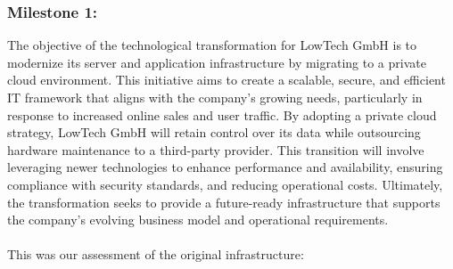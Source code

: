 \documentclass{llncs}
\begin{document}
\subsubsection{Milestone 1:}

The objective of the technological transformation for LowTech GmbH is to modernize its server and application infrastructure by migrating to a private cloud environment.
This initiative aims to create a scalable, secure, and efficient IT framework that aligns with the company's growing needs, particularly in response to increased online sales and user traffic.
By adopting a private cloud strategy, LowTech GmbH will retain control over its data while outsourcing hardware maintenance to a third-party provider.
This transition will involve leveraging newer technologies to enhance performance and availability, ensuring compliance with security standards, and reducing operational costs.
Ultimately, the transformation seeks to provide a future-ready infrastructure that supports the company's evolving business model and operational requirements.
\paragraph{}
This was our assessment of the original infrastructure:
\end{document}
